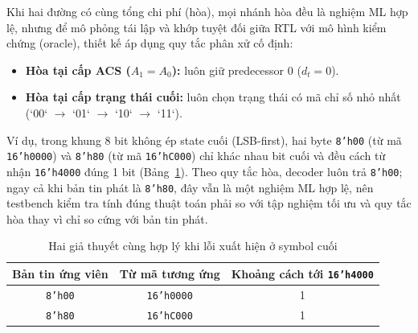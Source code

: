 \documentclass[12pt,a4paper]{article}
\DeclareRobustCommand{\code}[1]{\texttt{#1}}
\renewcommand{\_}{\originalunderscore\allowbreak}
\begin{document}
Khi hai đường có cùng tổng chi phí (hòa), mọi nhánh hòa đều là nghiệm ML hợp lệ, nhưng để mô phỏng tái lập và khớp tuyệt đối giữa RTL với mô hình kiểm chứng (oracle), thiết kế áp dụng quy tắc phân xử cố định:
\begin{itemize}
\item \textbf{Hòa tại cấp ACS ($A_1=A_0$):} luôn giữ predecessor 0 ($d_t=0$).
\item \textbf{Hòa tại cấp trạng thái cuối:} luôn chọn trạng thái có mã chỉ số nhỏ nhất (`00` $\rightarrow$ `01` $\rightarrow$ `10` $\rightarrow$ `11`).
\end{itemize}
Ví dụ, trong khung 8 bit không ép state cuối (LSB-first), hai byte \code{8'h00} (từ mã \code{16'h0000}) và \code{8'h80} (từ mã \code{16'hC000}) chỉ khác nhau bit cuối và đều cách từ nhận \code{16'h4000} đúng 1 bit (Bảng~\ref{tab:theory-tie}). Theo quy tắc hòa, decoder luôn trả \code{8'h00}; ngay cả khi bản tin phát là \code{8'h80}, đây vẫn là một nghiệm ML hợp lệ, nên testbench kiểm tra tính đúng thuật toán phải so với tập nghiệm tối ưu và quy tắc hòa thay vì chỉ so cứng với bản tin phát.

\begin{table}[H]\centering\small
\begin{tabular}{ccc}\toprule
\textbf{Bản tin ứng viên}&\textbf{Từ mã tương ứng}&\textbf{Khoảng cách tới \code{16'h4000}}\\\midrule
\code{8'h00}&\code{16'h0000}&1\\\code{8'h80}&\code{16'hC000}&1\\\bottomrule
\end{tabular}
\caption{Hai giả thuyết cùng hợp lý khi lỗi xuất hiện ở symbol cuối}\label{tab:theory-tie}
\end{table}
\end{document}
